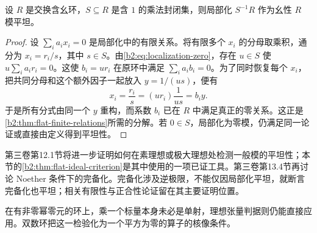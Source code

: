 \begin{proposition}\label{b2:prop:localization-flat}
	设 \(R\) 是交换含幺环，\(S\subseteq R\) 是含 \(1\) 的乘法封闭集，则局部化 \(S^{-1}R\) 作为幺性 \(R\) 模平坦。
\end{proposition}
\begin{proof}
	设 \(\sum_i a_i x_i=0\) 是局部化中的有限关系。将有限多个 \(x_i\) 的分母取乘积，通分为 \(x_i=r_i/s\)，其中 \(s\in S\)。由\eqref{b2:eq:localization-zero}，存在 \(u\in S\) 使 \(u\sum_i a_i r_i=0\)。这使 \(b_i=ur_i\) 在原环中满足 \(\sum_i a_i b_i=0\)。为了同时恢复每个 \(x_i\)，把共同分母和这个额外因子一起放入 \(y=1/(us)\)，便有
	\[
		x_i=\frac{r_i}s=(ur_i)\frac1{us}=b_i y.
	\]
	于是所有分式由同一个 \(y\) 重构，而系数 \(b_i\) 已在 \(R\) 中满足真正的零关系。这正是\cref{b2:thm:flat-finite-relations}所需的分解。若 \(0\in S\)，局部化为零模，仍满足同一论证或直接由定义得到平坦性。
\end{proof}

第三卷第12.1节将进一步证明如何在素理想或极大理想处检测一般模的平坦性；本节的\cref{b2:thm:flat-ideal-criterion}是其中使用的一项已证工具。第三卷第13.4节再讨论 Noether 条件下的完备化。完备化涉及逆极限，不能仅因局部化平坦，就断言完备化也平坦；相关有限性与正合性论证留在其主要证明位置。

\ProseParagraphBreak
在有非零幂零元的环上，乘一个标量本身未必是单射，理想张量判据则仍能直接应用。双数环把这一检验化为一个平方为零的算子的核像条件。

